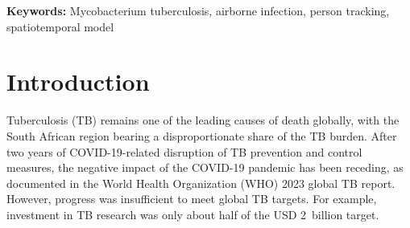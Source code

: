 \documentclass[fleqn,11pt]{wlscirep}
\begin{document}
\begin{abstract}


\par
\end{abstract}


\flushbottom
\maketitle
\setcounter{page}{1}
\thispagestyle{fancy}

\vspace{2em}


\vspace{0.5em}

\noindent\textbf{Keywords:} Mycobacterium tuberculosis, airborne infection, person tracking, spatiotemporal model
\newpage

\sloppy
\raggedbottom

\newpage

\section*{Introduction} 

Tuberculosis (TB) remains one of the leading causes of death globally, with the South African region bearing a disproportionate share of the TB burden.  After two years of COVID-19-related disruption of TB prevention and control measures, the negative impact of the COVID-19 pandemic has been receding, as documented in the World Health Organization (WHO) 2023 global TB report\cite{WHO2023TBReport}. However, progress was insufficient to meet global TB targets\cite{WHO2023TBReport}. For example, investment in TB research was only about half of the USD 2~billion target\cite{WHO2023TBReport}.
\end{document}
